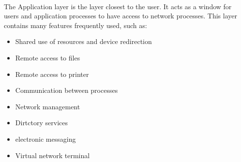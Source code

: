 \documentclass[12pt,a4paper]{report}
\begin{document}
\paragraph{}The Application layer is the layer closest to the user. It acts as a window for users and application processes to have access to network processes. This layer contains many features frequently used, such as:
\begin{itemize}
\item Shared use of resources and device redirection
\item Remote access to files
\item Remote access to printer
\item Communication between processes
\item Network management
\item Dirtctory services
\item electronic messaging
\item Virtual network terminal
\end{itemize}




\end{document}
